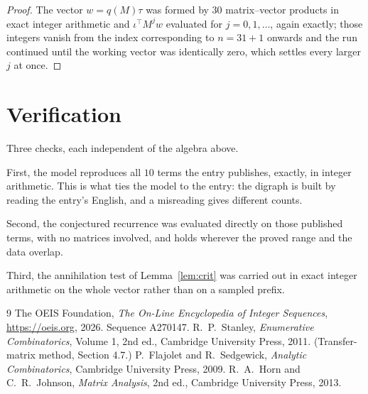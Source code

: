 \documentclass[11pt,a4paper]{article}
\theoremstyle{plain}
\theoremstyle{definition}
\begin{document}
\begin{proof}
The vector $w=q(M)\tau$ was formed by $30$ matrix--vector products in exact integer
arithmetic and $\iota^{\!\top}M^{j}w$ evaluated for $j=0,1,\dots$, again exactly; those
integers vanish from the index corresponding to $n=31+1$ onwards and the run continued
until the working vector was identically zero, which settles every larger $j$ at once.
\end{proof}

\section{Verification}

Three checks, each independent of the algebra above.

First, the model reproduces all $10$ terms the entry publishes, exactly, in integer
arithmetic. This is what ties the model to the entry: the digraph is built by reading the
entry's English, and a misreading gives different counts.

Second, the conjectured recurrence was evaluated directly on those published terms, with no
matrices involved, and holds wherever the proved range and the data overlap.

Third, the annihilation test of Lemma~\ref{lem:crit} was carried out in exact integer
arithmetic on the whole vector rather than on a sampled prefix.

\begin{thebibliography}{9}
 The OEIS Foundation, \emph{The On-Line Encyclopedia of Integer
Sequences}, \url{https://oeis.org}, 2026. Sequence A270147.
 R.~P.~Stanley, \emph{Enumerative Combinatorics}, Volume 1, 2nd ed.,
Cambridge University Press, 2011. (Transfer-matrix method, Section 4.7.)
 P.~Flajolet and R.~Sedgewick, \emph{Analytic Combinatorics}, Cambridge
University Press, 2009.
 R.~A.~Horn and C.~R.~Johnson, \emph{Matrix Analysis}, 2nd ed., Cambridge
University Press, 2013.
\end{thebibliography}
\end{document}
